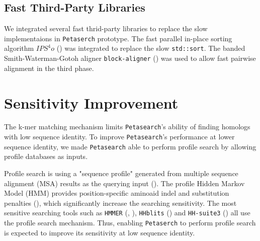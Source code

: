 \subsection{Fast Third-Party Libraries}

We integrated several fast thrid-party libraries to replace the slow implementaions in \texttt{Petaserch} prototype. The fast parallel in-place sorting algorithm $IPS^4o$ (\cite{axtmann2017place}) was integrated to replace the slow \texttt{std::sort}. The banded Smith-Waterman-Gotoh aligner \texttt{block-aligner} (\cite{liu2021block}) was used to allow fast pairwise alignment in the third phase.

\section{Sensitivity Improvement}

The k-mer matching mechanism limits \texttt{Petasearch}'s ability of finding homologs with low sequence identity. To improve \texttt{Petasearch}'s performance at lower sequence identity, we made \texttt{Petasearch} able to perform profile search by allowing profile databases as inputs.

Profile search is using a "sequence profile" generated from multiple sequence alignment (MSA) results as the querying input (\cite{steinegger2019hh}). The profile Hidden Markov Model (HMM) provides position-specific aminoaid indel and substitution penalties (\cite{steinegger2019hh}), which significantly increase the searching sensitivity. The most sensitive searching tools such as \texttt{HMMER} (\cite{eddy2009new}, \cite{eddy2011accelerated}), \texttt{HHblits} (\cite{remmert2012hhblits}) and \texttt{HH-suite3} (\cite{steinegger2019hh}) all use the profile search mechanism. Thus, enabling \texttt{Petaserch} to perform profile search is expected to improve its sensitivity at low sequence identity.

\section{}
